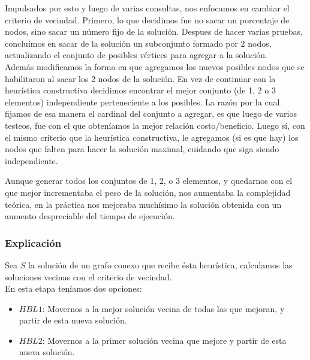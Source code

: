 \documentclass[a4paper, 10pt]{article}
\begin{document}
Impulsados por esto y luego de varias consultas, nos enfocamos en cambiar el criterio de vecindad. Primero, lo que decidimos fue no sacar un porcentaje de nodos, sino sacar un n\'umero fijo de la soluci\'on. Despues de hacer varias pruebas, conclu\'imos en sacar de la soluci\'on un subconjunto formado por 2 nodos, actualizando el conjunto de posibles v\'ertices para agregar a la soluci\'on. \\

Adem\'as modificamos la forma en que agregamos los nuevos posibles nodos que se habilitaron al sacar los 2 nodos de la soluci\'on. En vez de continuar con la heur\'istica constructiva decidimos encontrar el mejor conjunto (de 1, 2 o 3 elementos) independiente perteneciente a los posibles. La raz\'on por la cual fijamos de esa manera el cardinal del conjunto a agregar, es que luego de varios testeos, fue con el que obten\'iamos la mejor relaci\'on costo/beneficio. Luego s\'i, con el mismo criterio que la heur\'istica constructiva, le agregamos (si es que hay) los nodos que falten para hacer la soluci\'on maximal, cuidando que siga siendo independiente.

Aunque generar todos los conjuntos de 1, 2, o 3 elementos, y quedarnos con el que mejor incrementaba el peso de la soluci\'on, nos aumentaba la complejidad te\'orica, en la pr\'actica nos mejoraba much\'isimo la soluci\'on obtenida con un aumento despreciable del tiempo de ejecuci\'on.

\subsubsection{Explicaci\'on}
Sea $S$ la soluci\'on de un grafo conexo que recibe \'esta heur\'istica, calculamos las soluciones vecinas con el criterio de vecindad. \\

En esta etapa ten\'iamos dos opciones:

\begin{itemize}
	\item  $HBL1$: Movernos a la mejor soluci\'on vecina de todas las que mejoran, y partir de esta nueva soluci\'on.
	\item  $HBL2$: Movernos a la primer soluci\'on vecina que mejore y partir de esta nueva soluci\'on.
\end{itemize}
\end{document}
